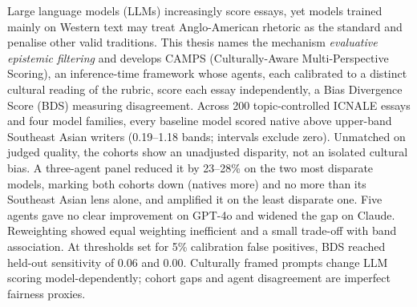 
Large language models (LLMs) increasingly score essays, yet models
trained mainly on Western text may treat Anglo-American rhetoric as
the standard and penalise other valid traditions. This thesis names the
mechanism \emph{evaluative epistemic filtering} and develops
CAMPS (Culturally-Aware Multi-Perspective Scoring), an inference-time
framework whose agents, each calibrated to a distinct cultural
reading of the rubric, score each essay independently, a Bias
Divergence Score (BDS) measuring disagreement. Across 200 topic-controlled ICNALE
essays and four model families, every baseline model scored native
above upper-band Southeast Asian writers (0.19--1.18 bands; intervals
exclude zero). Unmatched on judged quality, the cohorts show an unadjusted
disparity, not an isolated cultural bias. A
three-agent panel reduced it by 23--28\% on the two most disparate
models, marking both cohorts down (natives more) and no more than
its Southeast Asian lens alone, and amplified it on the least
disparate one. Five agents gave no clear improvement on GPT-4o and widened the
gap on Claude. Reweighting showed equal weighting inefficient and a small
trade-off with band association.
At thresholds set for 5\% calibration false positives, BDS reached
held-out sensitivity of 0.06 and 0.00. Culturally framed prompts change LLM scoring model-dependently;
cohort gaps and agent disagreement are imperfect fairness proxies.
